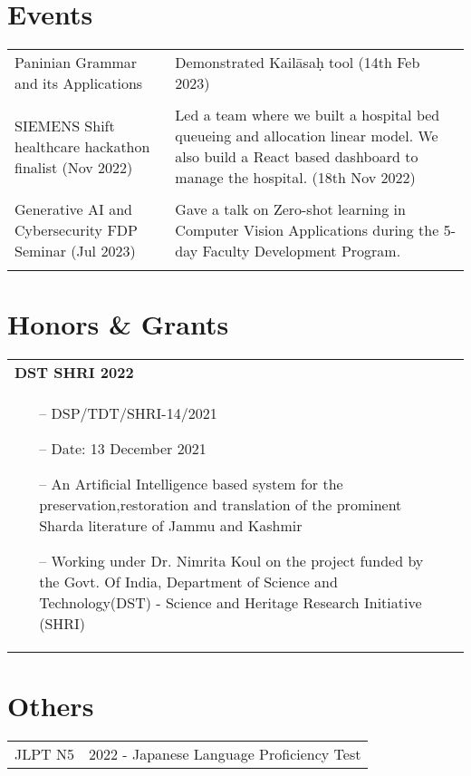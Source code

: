 \documentclass[a4paper, 11pt]{article}
\begin{document}
	\section{Events}
	\begin{tabularx}{\linewidth}{@{}l X@{}}
		Paninian Grammar and its Applications &  \normalsize{Demonstrated Kailāsaḥ tool (14th Feb 2023)}
		\\
		\\
		SIEMENS Shift healthcare hackathon finalist (Nov 2022)  &  \normalsize{Led a team where we built a hospital bed queueing and allocation linear model. We also build a React based dashboard to manage the hospital. (18th Nov 2022)}
		\\
		\\ 
		Generative AI and Cybersecurity FDP Seminar (Jul 2023)   &  \normalsize{Gave a talk on Zero-shot learning in Computer Vision Applications during the 5-day Faculty Development Program. }
		\\
		\\
	\end{tabularx}
	
	\section{Honors \& Grants }
	
	\begin{tabularx}{\linewidth}{ @{}l r@{} }
		\textbf{DST SHRI 2022} & \hfill \href{https://revaeduin.s3.ap-south-1.amazonaws.com/uploads/images/63bfa2afc35011673503407.pdf}{} \\[2.75pt]
		
		\begin{minipage}[t]{\linewidth}
			\begin{itemize}[nosep,after=\strut, leftmargin=1em, itemsep=3pt]
				\item[--] DSP/TDT/SHRI-14/2021
				\item[--] Date: 13 December 2021
				\item[--] An Artificial Intelligence based system for the preservation,restoration and translation of the prominent Sharda literature of Jammu and Kashmir
				\item[--] Working under Dr. Nimrita Koul on the project funded by the Govt. Of India, Department of Science and Technology(DST) - Science and Heritage Research Initiative (SHRI)
			\end{itemize}
		\end{minipage}
		
	\end{tabularx}
	\section{Others}
	\begin{tabularx}{\linewidth}{@{}l X@{}}
		JLPT N5 &  \normalsize{ 2022 - Japanese Language Proficiency Test}\\
	\end{tabularx}
	
	\vfill
	
\end{document}
